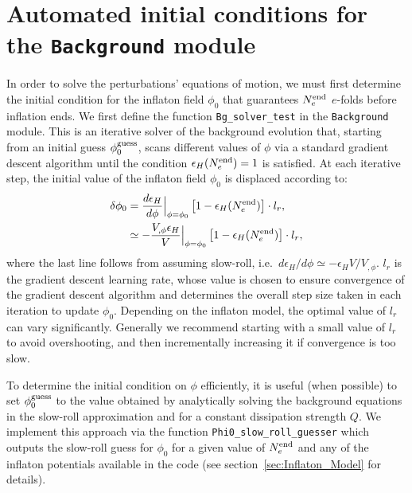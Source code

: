 \documentclass[a4paper,11pt]{article}
\begin{document}
\section{Automated initial conditions for the \texttt{Background} module
\label{Appendix:ICs}}
In order to solve the perturbations' equations of motion, we must first determine the initial condition for the inflaton field $\phi_0$ that guarantees $N^{\rm{end}}_e$ $e$-folds before inflation ends. We first define the function \texttt{Bg\_solver\_test} in the \texttt{Background} module. This is an iterative solver of the background evolution that, starting from an initial guess $\phi_0^{\rm{guess}}$, scans different values of $\phi$ via a standard gradient descent algorithm until the condition $\epsilon_H (N^{\rm{end}}_e ) = 1$ is satisfied. At each iterative step, the initial value of the inflaton field $\phi_0$ is displaced according to:
\begin{align}
    \delta\phi_0&= \frac{d \epsilon_H}{d \phi}\Big|_{\phi=\phi_0} \left[1-\epsilon_H(N_e^{\rm{end}})\right] \cdot l_r, \\
    &\simeq - \frac{V_{,\phi} \epsilon_H}{V}\Big|_{\phi=\phi_0} \left[1-\epsilon_H(N_e^{\rm{end}})\right]\cdot l_r,
\end{align}
where the last line follows from assuming slow-roll, i.e.\ $d\epsilon_H/d\phi\simeq-\epsilon_H V/V_{,\phi}$.
$l_r$ is the gradient descent learning rate, whose value is chosen to ensure convergence of the gradient descent algorithm and determines the overall step size taken in each iteration to update $\phi_0$. Depending on the inflaton model, the optimal value of $l_r$ can vary significantly. Generally we recommend starting with a small value of $l_r$ to avoid overshooting, and then incrementally increasing it if convergence is too slow.

To determine the initial condition on $\phi$ efficiently, it is useful (when possible) to set $\phi_0^{\rm{guess}}$ to the value obtained by analytically solving the background equations in the slow-roll approximation and for a constant dissipation strength $Q$. We implement this approach via the function \texttt{Phi0\_slow\_roll\_guesser} which outputs the slow-roll guess for $\phi_0$ for a given value of $N_e^{\rm{end}}$ and any of the inflaton potentials available in the code (see section~\ref{sec:Inflaton_Model} for details).
\end{document}
